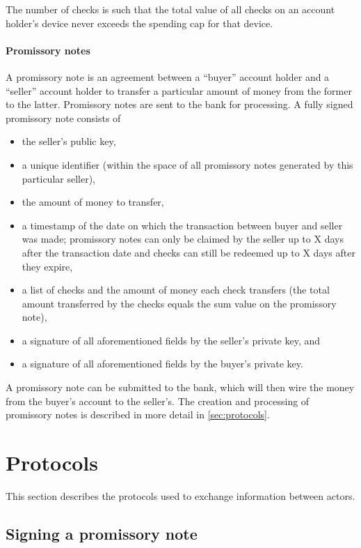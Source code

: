 \documentclass[12pt,a4paper]{article}
\begin{document}
\begin{multicols}{2}
	The number of checks is such that the total value of all checks on an account holder's device never exceeds the spending cap for that device.

	\paragraph{Promissory notes}
	
	A promissory note is an agreement between a ``buyer'' account holder and a ``seller'' account holder to transfer a particular amount of money from the former to the latter. Promissory notes are sent to the bank for processing. A fully signed promissory note consists of
	
	\begin{itemize}
		\item the seller's public key,
		\item a unique identifier (within the space of all promissory notes generated by this particular seller),
		\item the amount of money to transfer,
		\item a timestamp of the date on which the transaction between buyer and seller was made; promissory notes can only be claimed by the seller up to X days after the transaction date and checks can still be redeemed up to X days after they expire,
		\item a list of checks and the amount of money each check transfers (the total amount transferred by the checks equals the sum value on the promissory note),
		\item a signature of all aforementioned fields by the seller's private key, and
		\item a signature of all aforementioned fields by the buyer's private key.
	\end{itemize}

	A promissory note can be submitted to the bank, which will then wire the money from the buyer's account to the seller's. The creation and processing of promissory notes is described in more detail in \autoref{sec:protocols}.

	\section{Protocols}
	\label{sec:protocols}
	
	This section describes the protocols used to exchange information between actors.
	
	\subsection{Signing a promissory note}


\end{multicols}
\end{document}

